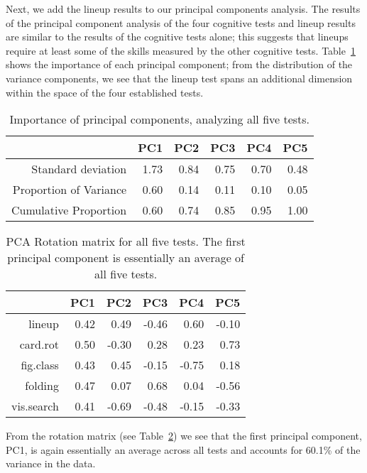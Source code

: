 \documentclass[journal]{vgtc}\usepackage[]{graphicx}\usepackage[]{color}
\begin{document}
Next, we add the lineup results to our principal components analysis. The results of the principal component analysis of the four cognitive tests and lineup results are similar to the results of the cognitive tests alone; this suggests that lineups require at least some of the skills measured by the other cognitive tests. Table~\ref{tab:PCAvariance5} shows the importance of each principal component; from the distribution of the variance components, we see that the lineup test spans an additional dimension within the space of the four established tests. 
\begin{table}[ht]
\centering
\caption{Importance of principal components, analyzing all five tests.\label{tab:PCAvariance5}} 
{\footnotesize
\begin{tabular}{rrrrrr}
  \hline
 & PC1 & PC2 & PC3 & PC4 & PC5 \\ 
  \hline
Standard deviation & 1.73 & 0.84 & 0.75 & 0.70 & 0.48 \\ 
  Proportion of Variance & 0.60 & 0.14 & 0.11 & 0.10 & 0.05 \\ 
  Cumulative Proportion & 0.60 & 0.74 & 0.85 & 0.95 & 1.00 \\ 
   \hline
\end{tabular}
}
\end{table}


\begin{table}[ht]
\centering
\caption{PCA Rotation matrix for all five tests. The first principal component is essentially an average of all five tests. 
             \label{tab:PCArotation5}} 
\begin{tabular}{rrrrrr}
  \hline
 & PC1 & PC2 & PC3 & PC4 & PC5 \\ 
  \hline
lineup & 0.42 & 0.49 & -0.46 & 0.60 & -0.10 \\ 
  card.rot & 0.50 & -0.30 & 0.28 & 0.23 & 0.73 \\ 
  fig.class & 0.43 & 0.45 & -0.15 & -0.75 & 0.18 \\ 
  folding & 0.47 & 0.07 & 0.68 & 0.04 & -0.56 \\ 
  vis.search & 0.41 & -0.69 & -0.48 & -0.15 & -0.33 \\ 
   \hline
\end{tabular}
\end{table}

From the rotation matrix (see Table~\ref{tab:PCArotation5}) we see that  
the first principal component, PC1, is again essentially an average across all tests and accounts for 60.1\% of the variance in the data. 
\end{document}
